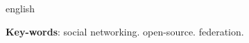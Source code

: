 \begin{resumo}[Abstract]
  \begin{otherlanguage*}{english} 
  
  \vspace{\onelineskip}
 
  \noindent 
  \textbf{Key-words}: social networking. open-source. federation.
  \end{otherlanguage*}
\end{resumo}


